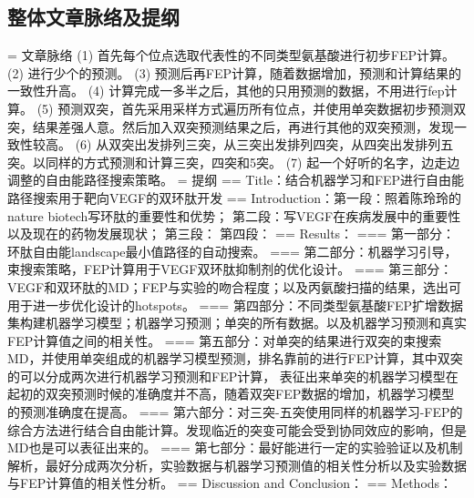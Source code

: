 \subsection{整体文章脉络及提纲}
\noindent = 文章脉络
\newline\indent (1) 首先每个位点选取代表性的不同类型氨基酸进行初步FEP计算。
\newline\indent (2) 进行少个的预测。
\newline\indent (3) 预测后再FEP计算，随着数据增加，预测和计算结果的一致性升高。
\newline\indent (4) 计算完成一多半之后，其他的只用预测的数据，不用进行fep计算。
\newline\indent (5) 预测双突，首先采用采样方式遍历所有位点，并使用单突数据初步预测双突，结果差强人意。然后加入双突预测结果之后，再进行其他的双突预测，发现一致性较高。
\newline\indent (6) 从双突出发排列三突，从三突出发排列四突，从四突出发排列五突。以同样的方式预测和计算三突，四突和5突。 
\newline\indent (7) 起一个好听的名字，边走边调整的自由能路径搜索策略。 
\newline\noindent = 提纲
\newline\indent == Title：结合机器学习和FEP进行自由能路径搜索用于靶向VEGF的双环肽开发
\newline\indent == Introduction：第一段：照着陈玲玲的nature biotech写环肽的重要性和优势；
第二段：写VEGF在疾病发展中的重要性以及现在的药物发展现状；
第三段：
第四段：
\newline\indent == Results：
\newline\indent === 第一部分：环肽自由能landscape最小值路径的自动搜索。
\newline\indent === 第二部分：机器学习引导，束搜索策略，FEP计算用于VEGF双环肽抑制剂的优化设计。
\newline\indent === 第三部分：VEGF和双环肽的MD；FEP与实验的吻合程度；以及丙氨酸扫描的结果，选出可用于进一步优化设计的hotspots。
\newline\indent === 第四部分：不同类型氨基酸FEP扩增数据集构建机器学习模型；机器学习预测；单突的所有数据。以及机器学习预测和真实FEP计算值之间的相关性。
\newline\indent === 第五部分：对单突的结果进行双突的束搜索MD，并使用单突组成的机器学习模型预测，排名靠前的进行FEP计算，其中双突的可以分成两次进行机器学习预测和FEP计算，
表征出来单突的机器学习模型在起初的双突预测时候的准确度并不高，随着双突FEP数据的增加，机器学习模型的预测准确度在提高。
\newline\indent === 第六部分：对三突-五突使用同样的机器学习-FEP的综合方法进行结合自由能计算。发现临近的突变可能会受到协同效应的影响，但是MD也是可以表征出来的。
\newline\indent === 第七部分：最好能进行一定的实验验证以及机制解析，最好分成两次分析，实验数据与机器学习预测值的相关性分析以及实验数据与FEP计算值的相关性分析。
\newline\indent == Discussion and Conclusion：
\newline\indent == Methods：
